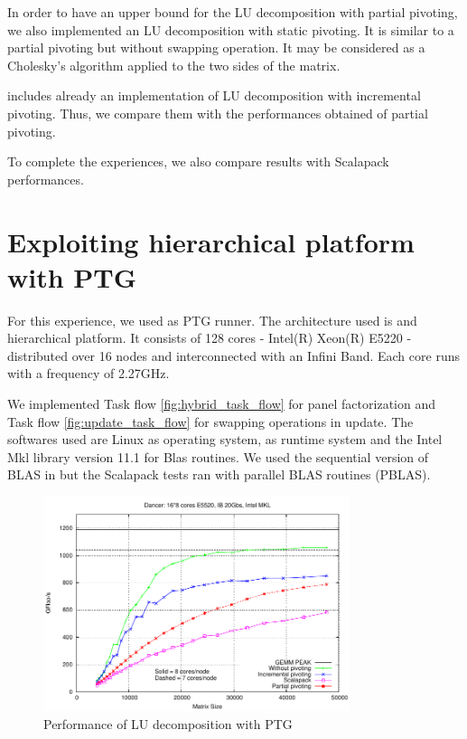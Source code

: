 In order to have an upper bound for the LU decomposition with partial pivoting, we also implemented an LU decomposition with static pivoting. It is similar to a partial pivoting but without swapping operation. It may be considered as a Cholesky's algorithm applied to the two sides of the matrix.

\dague includes already an implementation of LU decomposition with incremental pivoting. Thus, we compare them with the performances obtained of partial pivoting.

To complete the experiences, we also compare results with Scalapack performances.

\section*{Exploiting hierarchical platform with PTG}
For this experience, we used \dague as PTG runner. The architecture used is and hierarchical platform. It consists of 128 cores - Intel(R) Xeon(R) E5220 - distributed over 16 nodes and interconnected with an Infini Band. Each core runs with a frequency of 2.27GHz. 

We implemented Task flow \ref{fig:hybrid_task_flow} for panel factorization and Task flow \ref{fig:update_task_flow} for swapping operations in update. The softwares used are Linux as operating system, \dague as runtime system and the Intel Mkl library version 11.1 for Blas routines. We used the sequential version of BLAS in \dague but the Scalapack tests ran with parallel BLAS routines (PBLAS).

\begin{figure}
\centering
\includegraphics[width=0.8\textwidth]{figures/gepp.pdf}
\caption{Performance of LU decomposition with PTG\label{fig:pp}} 
\end{figure}

